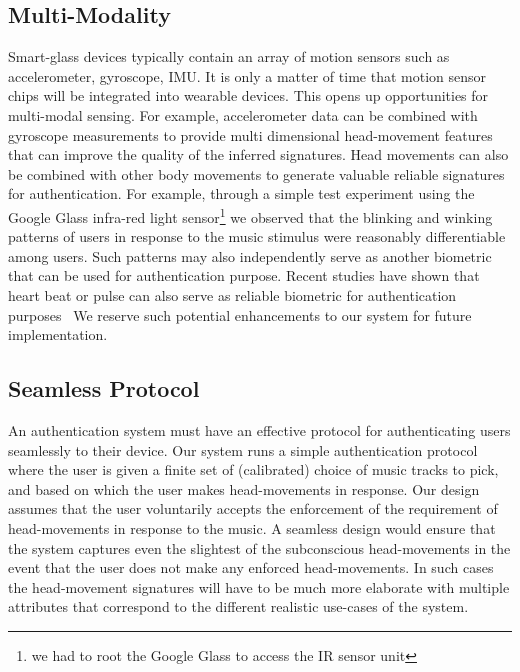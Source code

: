 \subsection{Multi-Modality}
Smart-glass devices typically contain an array of motion sensors such as
accelerometer, gyroscope, IMU. It is only a matter of time that motion sensor
chips will be integrated into wearable devices.
This opens up opportunities for multi-modal sensing. For example,
accelerometer data can be combined with gyroscope measurements to provide
multi dimensional head-movement features that can improve the quality of the
inferred signatures.
Head movements can also be combined with other body movements to generate
valuable reliable signatures for authentication.
For example, through a simple test experiment using the Google Glass
infra-red light sensor\footnote{we had to root the Google Glass to access the
IR sensor unit} we observed that the blinking and winking patterns of users in
response to the music stimulus were reasonably differentiable among users.
Such patterns may also independently serve as another biometric that can be
used for authentication purpose.
Recent studies have shown that heart beat or pulse can also serve as reliable
biometric for authentication purposes~\cite{hernandezbioglass,nymi}
We reserve such potential enhancements to our system for future implementation.

\subsection{Seamless Protocol}
An authentication system must have an effective protocol for authenticating
users seamlessly to their device. Our system runs a simple authentication
protocol where the user is given a finite set of (calibrated) choice of music
tracks to pick, and based on which the user makes head-movements in response.
Our design assumes that the user voluntarily accepts the enforcement of the
requirement of head-movements in response to the music. A seamless design
would ensure that the system captures even the slightest of the subconscious
head-movements in the event that the user does not make any enforced
head-movements. In such cases the head-movement signatures will have to be
much more elaborate with multiple attributes that correspond to the different
realistic use-cases of the system.

